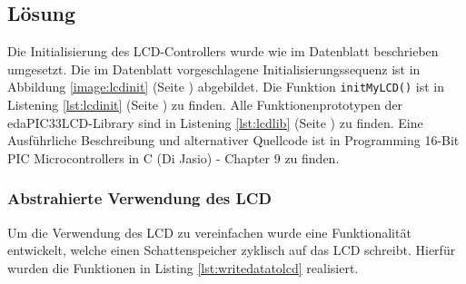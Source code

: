\subsection{Lösung}
Die Initialisierung des LCD-Controllers wurde wie im Datenblatt beschrieben umgesetzt. Die im Datenblatt vorgeschlagene Initialisierungssequenz ist in Abbildung \ref{image:lcdinit} (Seite \pageref{image:lcdinit}) abgebildet. Die Funktion \texttt{initMyLCD()} ist in Listening \ref{lst:lcdinit} (Seite \pageref{lst:lcdinit}) zu finden.\newline
\newline
Alle Funktionenprototypen der edaPIC33LCD-Library sind in Listening \ref{lst:lcdlib} (Seite \pageref{lst:lcdlib}) zu finden.\newline
Eine Ausführliche Beschreibung und alternativer Quellcode ist in Programming 16-Bit PIC Microcontrollers in C (Di Jasio) - Chapter 9 zu finden.\newline

\subsubsection*{Abstrahierte Verwendung des LCD}
Um die Verwendung des LCD zu vereinfachen wurde eine Funktionalität entwickelt, welche einen Schattenspeicher zyklisch auf das LCD schreibt. Hierfür wurden die Funktionen in Listing \ref{lst:writedatatolcd} realisiert.\newline


